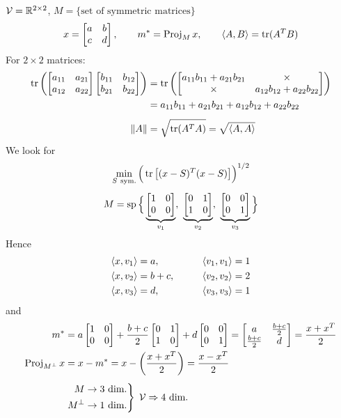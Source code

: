 \begin{example}
$\mathcal{V} = \mathbb{R}^{2\times 2}$, \quad $M = \{\text{set of symmetric matrices}\}$
\[
x = \begin{bmatrix}a & b\\ c & d\end{bmatrix}, \qquad m^* = \operatorname{Proj}_M x, \qquad \left\langle A, B \right\rangle = \operatorname{tr}(A^{T} B)
\]
For $2\times 2$ matrices:
\begin{align*}
\operatorname{tr}\left(\begin{bmatrix}a_{11} & a_{21}\\ a_{12} & a_{22}\end{bmatrix}\begin{bmatrix}b_{11} & b_{12}\\ b_{21} & b_{22}\end{bmatrix}\right)
&= \operatorname{tr}\left(\begin{bmatrix}a_{11}b_{11}+a_{21}b_{21} & \times\\ \times & a_{12}b_{12}+a_{22}b_{22}\end{bmatrix}\right)\\
&= a_{11}b_{11} + a_{21}b_{21} + a_{12}b_{12} + a_{22}b_{22}\\[4pt]
\left\lVert A \right\rVert &= \sqrt{\operatorname{tr}(A^{T} A)} = \sqrt{\left\langle A, A \right\rangle}
\end{align*}
We look for
\begin{gather*}
\min_{S\ \text{sym.}} \Big(\tr\big[(x-S)\T(x-S)\big]\Big)^{1/2}\\[4pt]
M = \Span\Big\{\underbrace{\bmat{1&0\\0&0}}_{v_1},\ \underbrace{\bmat{0&1\\1&0}}_{v_2},\ \underbrace{\bmat{0&0\\0&1}}_{v_3}\Big\}
\end{gather*}
Hence
\begin{alignat*}{2}
\left\langle x, v_1 \right\rangle &= a, &\qquad \left\langle v_1, v_1 \right\rangle &= 1\\
\left\langle x, v_2 \right\rangle &= b+c, &\qquad \left\langle v_2, v_2 \right\rangle &= 2\\
\left\langle x, v_3 \right\rangle &= d, &\qquad \left\langle v_3, v_3 \right\rangle &= 1
\end{alignat*}
and
\begin{align*}
m^* &= a\bmat{1&0\\0&0} + \frac{b+c}{2}\bmat{0&1\\1&0} + d\bmat{0&0\\0&1}
= \bmat{a & \frac{b+c}{2}\\ \frac{b+c}{2} & d} = \frac{x+x\T}{2}\\
\operatorname{Proj}_{M^\perp} x &= x-m^* = x - \left(\frac{x+x\T}{2}\right) = \frac{x-x\T}{2}\\[4pt]
&\left.\begin{aligned} M &\to 3\text{ dim.}\\ M^\perp &\to 1\text{ dim.}\end{aligned}\right\} \;\V \Rightarrow 4\text{ dim.}

\end{align*}
\end{example}
